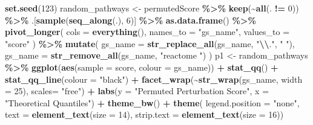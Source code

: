 \documentclass[9pt,a4paper,]{extarticle}
\newenvironment{Shaded}{\begin{snugshade}}{\end{snugshade}}
\newcommand{\AttributeTok}[1]{\textcolor[rgb]{0.13,0.29,0.53}{#1}}
\newcommand{\DecValTok}[1]{\textcolor[rgb]{0.00,0.00,0.81}{#1}}
\newcommand{\FunctionTok}[1]{\textcolor[rgb]{0.13,0.29,0.53}{\textbf{#1}}}
\newcommand{\NormalTok}[1]{#1}
\newcommand{\OtherTok}[1]{\textcolor[rgb]{0.56,0.35,0.01}{#1}}
\newcommand{\SpecialCharTok}[1]{\textcolor[rgb]{0.81,0.36,0.00}{\textbf{#1}}}
\newcommand{\StringTok}[1]{\textcolor[rgb]{0.31,0.60,0.02}{#1}}
\begin{document}
\begin{Shaded}
\begin{Highlighting}[]
\FunctionTok{set.seed}\NormalTok{(}\DecValTok{123}\NormalTok{)}
\NormalTok{random\_pathways }\OtherTok{\textless{}{-}}\NormalTok{ permutedScore }\SpecialCharTok{\%\textgreater{}\%}
  \FunctionTok{keep}\NormalTok{(}\SpecialCharTok{\textasciitilde{}}\FunctionTok{all}\NormalTok{(. }\SpecialCharTok{!=} \DecValTok{0}\NormalTok{)) }\SpecialCharTok{\%\textgreater{}\%} 
\NormalTok{  .[}\FunctionTok{sample}\NormalTok{(}\FunctionTok{seq\_along}\NormalTok{(.), }\DecValTok{6}\NormalTok{)] }\SpecialCharTok{\%\textgreater{}\%}
  \FunctionTok{as.data.frame}\NormalTok{() }\SpecialCharTok{\%\textgreater{}\%}
  \FunctionTok{pivot\_longer}\NormalTok{(}
    \AttributeTok{cols =} \FunctionTok{everything}\NormalTok{(), }\AttributeTok{names\_to =} \StringTok{"gs\_name"}\NormalTok{, }\AttributeTok{values\_to =} \StringTok{"score"}
\NormalTok{  ) }\SpecialCharTok{\%\textgreater{}\%}
  \FunctionTok{mutate}\NormalTok{(}
    \AttributeTok{gs\_name =} \FunctionTok{str\_replace\_all}\NormalTok{(gs\_name, }\StringTok{"}\SpecialCharTok{\textbackslash{}\textbackslash{}}\StringTok{."}\NormalTok{, }\StringTok{" "}\NormalTok{),}
    \AttributeTok{gs\_name =} \FunctionTok{str\_remove\_all}\NormalTok{(gs\_name, }\StringTok{"reactome "}\NormalTok{)}
\NormalTok{  ) }
\NormalTok{p1 }\OtherTok{\textless{}{-}}\NormalTok{ random\_pathways }\SpecialCharTok{\%\textgreater{}\%}
  \FunctionTok{ggplot}\NormalTok{(}\FunctionTok{aes}\NormalTok{(}\AttributeTok{sample =}\NormalTok{ score, }\AttributeTok{colour =}\NormalTok{ gs\_name)) }\SpecialCharTok{+}
  \FunctionTok{stat\_qq}\NormalTok{() }\SpecialCharTok{+}
  \FunctionTok{stat\_qq\_line}\NormalTok{(}\AttributeTok{colour =} \StringTok{"black"}\NormalTok{) }\SpecialCharTok{+}
  \FunctionTok{facet\_wrap}\NormalTok{(}\SpecialCharTok{\textasciitilde{}}\FunctionTok{str\_wrap}\NormalTok{(gs\_name, }\AttributeTok{width =} \DecValTok{25}\NormalTok{), }\AttributeTok{scales=} \StringTok{"free"}\NormalTok{) }\SpecialCharTok{+} 
  \FunctionTok{labs}\NormalTok{(}\AttributeTok{y =} \StringTok{"Permuted Perturbation Score"}\NormalTok{, }\AttributeTok{x =} \StringTok{"Theoretical Quantiles"}\NormalTok{) }\SpecialCharTok{+}
  \FunctionTok{theme\_bw}\NormalTok{() }\SpecialCharTok{+}
  \FunctionTok{theme}\NormalTok{(}
    \AttributeTok{legend.position =} \StringTok{"none"}\NormalTok{, }
    \AttributeTok{text =} \FunctionTok{element\_text}\NormalTok{(}\AttributeTok{size =} \DecValTok{14}\NormalTok{), }
    \AttributeTok{strip.text =} \FunctionTok{element\_text}\NormalTok{(}\AttributeTok{size =} \DecValTok{16}\NormalTok{))}

\end{Highlighting}
\end{Shaded}
\end{document}
